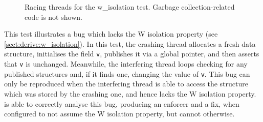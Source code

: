 \begin{figure}
  \centerline{
    {\hfill}
    {\hfill}
    {\hfill}
  }
  \caption{Racing threads for the w\_isolation test.  Garbage
    collection-related code is not shown.}
  \label{fig:w_isolation}
\end{figure}

This test illustrates a bug which lacks the W isolation property (see
\autoref{sect:derive:w_isolation}).  In this test, the crashing thread
allocates a fresh data structure, initialises the field \texttt{v},
publishes it via a global pointer, and then asserts that \texttt{v} is
unchanged.  Meanwhile, the interfering thread loops checking for any
published structures and, if it finds one, changing the value of
\texttt{v}.  This bug can only be reproduced when the interfering
thread is able to access the structure which was stored by the
crashing one, and hence lacks the W isolation property.
{\Implementation} is able to correctly analyse this bug, producing an
enforcer and a fix, when configured to not assume the W isolation
property, but cannot otherwise.

